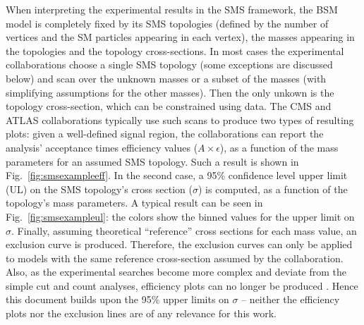 When interpreting the experimental results in the SMS framework, the
BSM model is completely fixed by its SMS topologies 
(defined by the number of vertices and the SM particles appearing in each vertex), 
the masses appearing in the topologies and the topology cross-sections.
In most cases the experimental collaborations choose a single SMS topology
(some exceptions are discussed below) and scan over the unknown masses or a subset of the masses
(with simplifying assumptions for the other masses).
Then the only unkown is the topology cross-section, which can be constrained using data.
The CMS and ATLAS collaborations typically use such scans to produce two types
of resulting plots: given a well-defined signal region, the collaborations
can report the analysis' acceptance times efficiency values ($A \times
\epsilon$), as a function of the mass parameters for an assumed SMS topology. 
Such a result is shown in Fig.~\ref{fig:smsexampleeff}. 
In the second case, a 95\% confidence level upper limit (UL) on
the SMS topology's cross section ($\sigma$) is computed, as a function
of the topology's mass parameters. A typical result can be seen in
Fig.~\ref{fig:smsexampleul}: the colors show the binned values for the upper limit on $\sigma$.
Finally, assuming theoretical ``reference'' cross sections for each mass value,
an exclusion curve is produced. Therefore, the exclusion curves can only be
applied to models with the same reference cross-section assumed by the collaboration.
Also, as the experimental searches become more complex and deviate from the simple cut and count analyses,
efficiency plots can no longer be produced . Hence this document builds upon the 
95\% upper limits on $\sigma$ -- neither the
efficiency plots nor the exclusion lines are of any relevance for this work.

